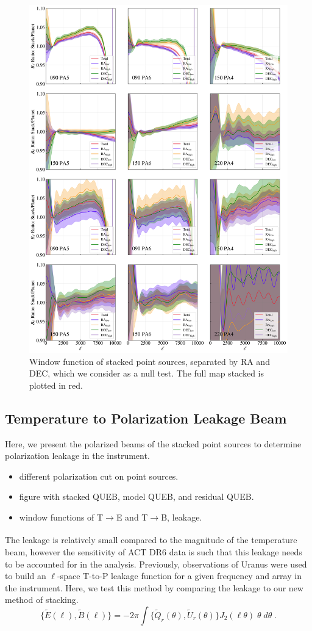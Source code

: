 \begin{figure}
    \centering
    \includegraphics[width=.9\textwidth]{Figures/Bells_ratio_planet.png}
    \caption{Window function of stacked point sources, separated by RA and DEC, which we consider as a null test.  The full map stacked is plotted in red.}
    \label{fig:bells}
\end{figure}

\subsection{Temperature to Polarization Leakage Beam}
\label{subsec:polbeam}
Here, we present the polarized beams of the stacked point sources to determine polarization leakage in the instrument. 
\begin{itemize}
    \item different polarization cut on point sources.
    \item figure with stacked QUEB, model QUEB, and residual QUEB.
    \item window functions of T$\xrightarrow[]{}$E and T$\xrightarrow[]{}$B, leakage.
\end{itemize}
The leakage is relatively small compared to the magnitude of the temperature beam, however the sensitivity of ACT DR6 data is such that this leakage needs to be accounted for in the analysis.  Previously, observations of Uranus were used to build an $\ell$-space T-to-P leakage function for a given frequency and array in the instrument.  Here, we test this method by comparing the leakage to our new method of stacking.
\begin{equation}
\label{eq:trans_e_b}
    \{\tilde{E}(\ell), \tilde{B}(\ell)\} = -2\pi\int \{\tilde{Q}_r(\theta),\tilde{U}_r(\theta) \} J_2(\ell\theta)\;\theta\;d\theta \; .
\end{equation}

